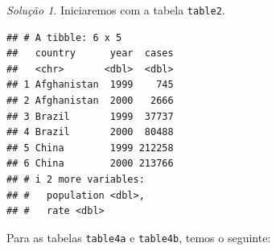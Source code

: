 \documentclass[
]{latex/krantz}
\newenvironment{Shaded}{\begin{snugshade}}{\end{snugshade}}
\newcommand{\AttributeTok}[1]{\textcolor[rgb]{0.13,0.29,0.53}{#1}}
\newcommand{\DecValTok}[1]{\textcolor[rgb]{0.00,0.00,0.81}{#1}}
\newcommand{\FunctionTok}[1]{\textcolor[rgb]{0.13,0.29,0.53}{\textbf{#1}}}
\newcommand{\NormalTok}[1]{#1}
\newcommand{\OtherTok}[1]{\textcolor[rgb]{0.56,0.35,0.01}{#1}}
\newcommand{\SpecialCharTok}[1]{\textcolor[rgb]{0.81,0.36,0.00}{\textbf{#1}}}
\newcommand{\StringTok}[1]{\textcolor[rgb]{0.31,0.60,0.02}{#1}}
\theoremstyle{definition}
\theoremstyle{definition}
\theoremstyle{definition}
\theoremstyle{definition}
\theoremstyle{remark}
\newtheorem*{solution}{Solução}
\begin{document}
\begin{solution}

Iniciaremos com a tabela \texttt{table2}.

\begin{Shaded}
\end{Shaded}

\begin{verbatim}
## # A tibble: 6 x 5
##   country      year  cases
##   <chr>       <dbl>  <dbl>
## 1 Afghanistan  1999    745
## 2 Afghanistan  2000   2666
## 3 Brazil       1999  37737
## 4 Brazil       2000  80488
## 5 China        1999 212258
## 6 China        2000 213766
## # i 2 more variables:
## #   population <dbl>,
## #   rate <dbl>
\end{verbatim}

Para as tabelas \texttt{table4a} e \texttt{table4b}, temos o seguinte:


\end{solution}
\end{document}
